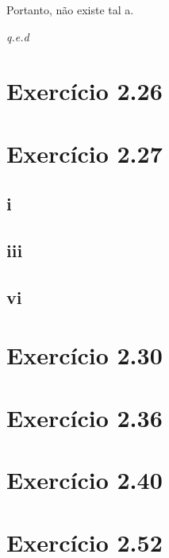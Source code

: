 \documentclass[12pt]{extarticle}
\newcommand{\fim}{\begin{flushright}
   \emph{q.e.d}
\end{flushright}}
\begin{document}
Portanto, não existe tal a.

\fim

\section{Exercício 2.26}

\section{Exercício 2.27}

\subsection{i}

\subsection{iii}

\subsection{vi}

\section{Exercício 2.30}

\section{Exercício 2.36}

\section{Exercício 2.40}

\section{Exercício 2.52}
\end{document}
